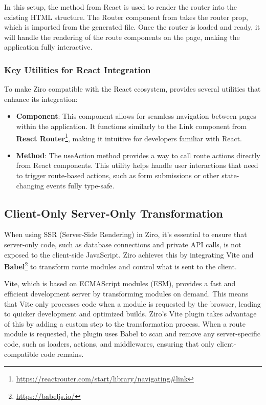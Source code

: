 In this setup, the  method from React is used to render the router into the existing HTML structure. The Router component from  takes the router prop, which is imported from the generated  file. Once the router is loaded and ready, it will handle the rendering of the route components on the page, making the application fully interactive.

\subsubsection{Key Utilities for React Integration}
To make Ziro compatible with the React ecosystem,  provides several utilities that enhance its integration:
\begin{itemize}
  \item \textbf{ Component}: This component allows for seamless navigation between pages within the application. It functions similarly to the Link component from \textbf{React Router}\footnote{\url{https://reactrouter.com/start/library/navigating\#link}}, making it intuitive for developers familiar with React.
  \item \textbf{ Method}: The useAction method provides a way to call route actions directly from React components. This utility helps handle user interactions that need to trigger route-based actions, such as form submissions or other state-changing events fully type-safe.
\end{itemize}

\subsection{Client-Only Server-Only Transformation}

When using SSR (Server-Side Rendering) in Ziro, it's essential to ensure that server-only code, such as database connections and private API calls, is not exposed to the client-side JavaScript. Ziro achieves this by integrating Vite and \textbf{Babel}\footnote{\url{https://babeljs.io/}} to transform route modules and control what is sent to the client.

Vite, which is based on ECMAScript modules (ESM), provides a fast and efficient development server by transforming modules on demand. This means that Vite only processes code when a module is requested by the browser, leading to quicker development and optimized builds. Ziro's Vite plugin takes advantage of this by adding a custom step to the transformation process. When a route module is requested, the plugin uses Babel to scan and remove any server-specific code, such as loaders, actions, and middlewares, ensuring that only client-compatible code remains.

